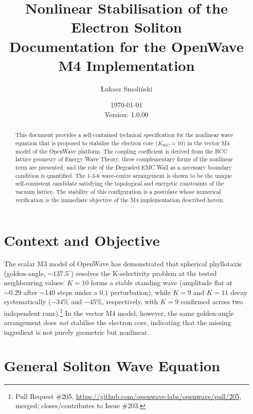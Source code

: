 \documentclass[11pt,a4paper]{article}
\title{\textbf{Nonlinear Stabilisation of the Electron Soliton}\\[4pt]
	\large Documentation for the OpenWave M4 Implementation}
\author{Łukasz Smoliński}
\date{\today \\ \small  Version: 1.0.00}
\begin{document}
	\maketitle
	
	\begin{abstract}
		This document provides a self-contained technical specification for the
		nonlinear wave equation that is proposed to stabilise the electron core
		($K_{WC}=10$) in the vector M4 model of the OpenWave platform.  The
		coupling coefficient is derived from the BCC lattice geometry of Energy
		Wave Theory, three complementary forms of the nonlinear term are presented,
		and the role of the Degraded EMC Wall as a necessary boundary condition is
		quantified.  The 1-3-6 wave-centre arrangement is shown to be the unique
		self-consistent candidate satisfying the topological and energetic
		constraints of the vacuum lattice.  The stability of this configuration
		is a postulate whose numerical verification is the immediate objective
		of the M4 implementation described herein.
	\end{abstract}
	
	\section{Context and Objective}
	

	
The scalar M3 model of OpenWave has demonstrated that spherical
phyllotaxis (golden-angle, $\sim 137.5^{\circ}$) resolves the
K-selectivity problem at the tested neighbouring values: $K=10$ forms
a stable standing wave (amplitude flat at $\sim 0.29$ after $\sim 140$
steps under a $0.1$ perturbation), while $K=9$ and $K=11$ decay
systematically ($-34\%$ and $-45\%$, respectively, with $K=9$
confirmed across two independent runs).\footnote{Pull Request \#205,
	\url{https://github.com/openwave-labs/openwave/pull/205}, merged;
	closes/contributes to Issue \#203.}  In the vector M4 model, however,
the same golden-angle arrangement does \emph{not} stabilise the
electron core, indicating that the missing ingredient is not purely
geometric but nonlinear.
	
	
	\section{General Soliton Wave Equation}
	
\end{document}
